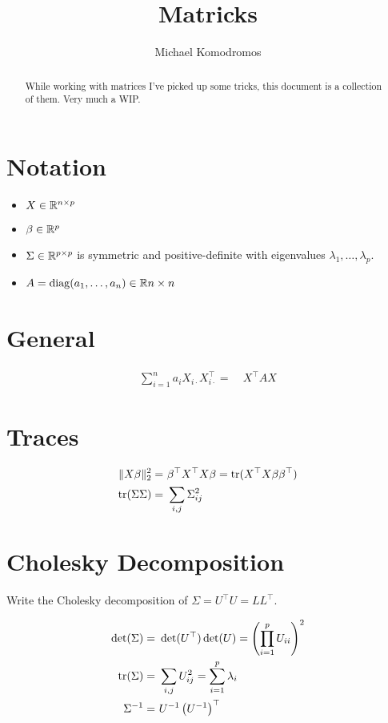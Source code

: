 \documentclass[12pt]{article}
\title{Matricks}
\author{Michael Komodromos}
\begin{document}
\maketitle

\begin{abstract}
While working with matrices I've picked up some tricks, this document is a collection of them. Very much a WIP.
\end{abstract}

\section{Notation}

\begin{itemize}
    \item $X \in \mathbb{R}^{n \times p}$
    \item $\beta \in \mathbb{R}^p$
    \item $\Sigma \in \mathbb{R}^{p \times p}$ is symmetric and positive-definite with eigenvalues $\lambda_1, \dots, \lambda_p$.
    \item $A = \operatorname{diag}(a_1, \dots, a_n) \in \mathbb{R}{n \times n}$
\end{itemize}



\section{General}

\begin{align}
    \sum_{i=1}^n a_i X_{i \cdot} X_{i \cdot}^\top = &\ X^\top AX
\end{align}

\section{Traces}

\begin{align}
    \| X \beta \|_2^2 = &\ \beta^\top X^\top X \beta = \operatorname{tr}(X^\top X \beta \beta^\top) \\
    \operatorname{tr}(\Sigma \Sigma) = &\ \sum_{i, j} \Sigma_{ij}^2
\end{align}


\section{Cholesky Decomposition}

Write the Cholesky decomposition of $\Sigma = U^\top U = LL^\top$.

\begin{align}
    \det(\Sigma) = &\ \det(U^\top) \det(U) = \left( \prod_{i=1}^p U_{ii} \right)^2 \\
    \operatorname{tr} (\Sigma) = &\ \sum_{i,j} U_{ij}^2 = \sum_{i=1}^p \lambda_i \\
    \Sigma^{-1}  = &\ U^{-1} \left(U^{-1} \right)^\top
\end{align}
\end{document}
